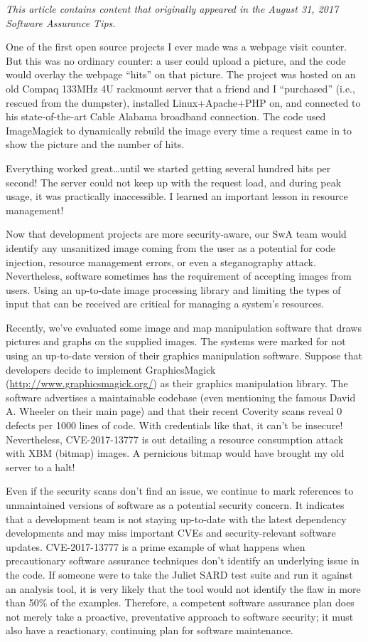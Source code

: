 \textit{This article contains content that originally appeared in the August 31, 2017 Software Assurance Tips.}

One of the first open source projects I ever made was a webpage visit counter. But this was no ordinary counter: a user could upload a picture, and the code would overlay the webpage ``hits'' on that picture. The project was hosted on an old Compaq 133MHz 4U rackmount server that a friend and I ``purchased'' (i.e., rescued from the dumpster), installed Linux+Apache+PHP on, and connected to his state-of-the-art Cable Alabama broadband connection. The code used ImageMagick to dynamically rebuild the image every time a request came in to show the picture and the number of hits.

Everything worked great\ldots until we started getting several hundred hits per second! The server could not keep up with the request load, and during peak usage, it was practically inaccessible. I learned an important lesson in resource management!

Now that development projects are more security-aware, our SwA team would identify any unsanitized image coming from the user as a potential for code injection, resource management errors, or even a steganography attack. Nevertheless, software sometimes has the requirement of accepting images from users. Using an up-to-date image processing library and limiting the types of input that can be received are critical for managing a system's resources.

Recently, we've evaluated some image and map manipulation software that draws pictures and graphs on the supplied images. The systems were marked for not using an up-to-date version of their graphics manipulation software. Suppose that developers decide to implement GraphicsMagick (\url{http://www.graphicsmagick.org/}) as their graphics manipulation library. The software advertises a maintainable codebase (even mentioning the famous David A. Wheeler on their main page) and that their recent Coverity scans reveal 0 defects per 1000 lines of code. With credentials like that, it can't be insecure! Nevertheless, CVE-2017-13777 is out detailing a resource consumption attack with XBM (bitmap) images.\autocite{20210906:CVE-2017-13777} A pernicious bitmap would have brought my old server to a halt!

Even if the security scans don't find an issue, we continue to mark references to unmaintained versions of software as a potential security concern. It indicates that a development team is not staying up-to-date with the latest dependency developments and may miss important CVEs and security-relevant software updates. CVE-2017-13777 is a prime example of what happens when precautionary software assurance techniques don't identify an underlying issue in the code. If someone were to take the Juliet SARD test suite and run it against an analysis tool, it is very likely that the tool would not identify the flaw in more than 50\% of the examples. Therefore, a competent software assurance plan does not merely take a proactive, preventative approach to software security; it must also have a reactionary, continuing plan for software maintenance.
